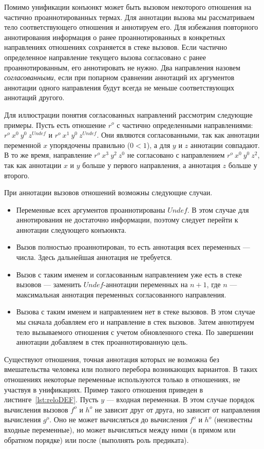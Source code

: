 \documentclass[conference,american,russian]{IEEEtran}
\begin{document}
Помимо унификации конъюнкт может быть вызовом некоторого отношения на частично проаннотированных термах. 
Для аннотации вызова мы рассматриваем тело соответствующего отношения и аннотируем его. 
Для избежания повторного аннотирования информация о ранее проаннотированных в конкретных направлениях отношениях сохраняется в стеке вызовов.
Если частично определенное направление текущего вызова согласовано с ранее проаннотированным, его аннотировать не нужно.  
Два направления назовем \emph{согласованными}, если при попарном сравнении аннотаций их аргументов аннотации одного направления будут всегда не меньше соответствующих аннотаций другого.

Для иллюстрации понятия согласованных направлений рассмотрим следующие примеры. 
Пусть есть отношение $r^o$ с частично определенными направлениями: $r^o \ x^0 \ y^0 \ z^{Undef}$ и $r^o \ x^1 \ y^0 \ z^{Undef}$.
Они являются согласованными, так как аннотации переменной $x$ упорядочены правильно ($0 < 1$), а для $y$ и $z$ аннотации совпадают.
В то же время, направление $r^o \ x^3 \ y^2 \ z^0$ не согласовано с направлением $r^o \ x^0 \ y^0 \ z^2$, так как аннотации $x$ и $y$ больше у первого направления, а аннотация $z$ больше у второго.

При аннотации вызовов отношений возможны следующие случаи. 
\begin{itemize}
    \item Переменные всех аргументов проаннотированы $Undef$. В этом случае для аннотирования не достаточно информации, поэтому следует перейти к аннотации следующего конъюнкта. 
    \item Вызов полностью проаннотирован, то есть аннотация всех переменных --- числа. Здесь дальнейшая аннотация не требуется.
    \item Вызов с таким именем и согласованным направлением уже есть в стеке вызовов --- заменить $Undef$-аннотации переменных на $n+1$, где $n$ --- максимальная аннотация переменных согласованного направления.
    \item Вызова с таким именем и направлением нет в стеке вызовов.
    В этом случае мы сначала добавляем его и направление в стек вызовов. 
    Затем аннотируем тело вызываемого отношения с учетом обновленного стека. 
    По завершении аннотации добавляем в стек проаннотированную цель.
\end{itemize}

Существуют отношения, точная аннотация которых не возможна без вмешательства человека или полного перебора возникающих вариантов. 
В таких отношениях некоторые переменные используются только в отношениях, не участвуя в унификациях.
Пример такого отношения приведен в листинге~\ref{lst:reloDEF}.
Пусть $y$ --- входная переменная.
В этом случае порядок вычисления вызовов $f^o$ и $h^o$ не зависит друг от друга, но зависит от направления вычисления $g^o$.
Оно не может вычисляться до вычисления $f^o$ и $h^o$ (неизвестны входные переменные), но может вычисляться между ними (в прямом или обратном порядке) или после (выполнять роль предиката).
\end{document}
